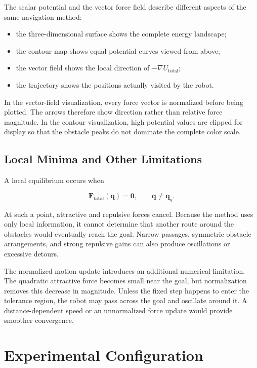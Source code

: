 \documentclass[10pt,twocolumn,a4paper]{article}
\begin{document}
The scalar potential and the vector force field describe different aspects
of the same navigation method:

\begin{itemize}
    \item the three-dimensional surface shows the complete energy landscape;
    \item the contour map shows equal-potential curves viewed from above;
    \item the vector field shows the local direction of
    $-\nabla U_{\mathrm{total}}$;
    \item the trajectory shows the positions actually visited by the robot.
\end{itemize}

In the vector-field visualization, every force vector is normalized before
being plotted. The arrows therefore show direction rather than relative
force magnitude. In the contour visualization, high potential values are
clipped for display so that the obstacle peaks do not dominate the complete
color scale.

\subsection{Local Minima and Other Limitations}

A local equilibrium occurs when

\begin{equation}
    \mathbf{F}_{\mathrm{total}}(\mathbf{q})
    =
    \mathbf{0},
    \qquad
    \mathbf{q}\neq\mathbf{q}_g.
    \label{eq:local_minimum}
\end{equation}

At such a point, attractive and repulsive forces cancel. Because the method
uses only local information, it cannot determine that another route around
the obstacles would eventually reach the goal. Narrow passages, symmetric
obstacle arrangements, and strong repulsive gains can also produce
oscillations or excessive detours.

The normalized motion update introduces an additional numerical limitation.
The quadratic attractive force becomes small near the goal, but
normalization removes this decrease in magnitude. Unless the fixed step
happens to enter the tolerance region, the robot may pass across the goal
and oscillate around it. A distance-dependent speed or an unnormalized
force update would provide smoother convergence.

\section{Experimental Configuration}
\end{document}
